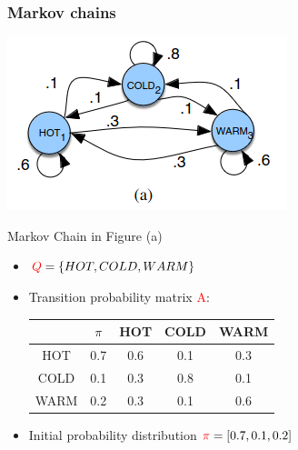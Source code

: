 \documentclass[13.5pt,aspecratio=169]{beamer}
\begin{document}
\begin{frame}
    \onehalfspacing
        \frametitle{Markov chains}
        
        \begin{minipage}{0.5\textwidth}
            \includegraphics[scale=0.7]{Example_1.png}
        \end{minipage}
        \begin{minipage}{0.49\textwidth}
            \begin{block}{}
                Markov Chain in Figure (a)
            \end{block}

            \begin{itemize}
                \item $\textcolor{red}{Q} = \{HOT, COLD, WARM \} $ 
                \item Transition probability matrix \textcolor{red}{A}: 
                \hspace*{-1cm}
                {
                \small
                \begin{tabular}{c|cccc}
                    $ $ & $\pi$ & HOT & COLD & WARM \\
                    \hline
                    HOT & 0.7 & 0.6 & 0.1 & 0.3 \\
                    COLD & 0.1 & 0.3 & 0.8 & 0.1\\
                    WARM & 0.2 & 0.3 & 0.1 & 0.6 \\
                \end{tabular}
                }
                \item Initial probability distribution $\textcolor{red}{\pi} = [0.7,0.1,0.2]$
                
            \end{itemize}

        \end{minipage}
        
\end{frame}
\end{document}
